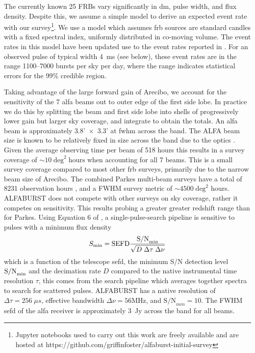 \documentclass[a4paper,fleqn,usenatbib]{mnras}
\begin{document}
The currently known 25 FRBs vary significantly in \gls{dm}, pulse width, and
flux density. Despite this, we assume a simple model to derive an expected
event rate with our survey\footnote{Jupyter notebooks used to carry out this
work are freely available and are hosted at
https://github.com/griffinfoster/alfaburst-initial-survey}.  We use a model
\citep[see equation 9 of][]{2013MNRAS.436L...5L} which assumes \gls{frb}
sources are standard candles with a fixed spectral index, uniformly distributed
in co-moving volume. The event rates in this model have been updated use to the
event rates reported in \cite{2016MNRAS.460.3370C}. For an observed pulse of
typical width 4~ms (see below), these event rates are in the range 1100--7000
bursts per sky per day, where the range indicates statistical errors for the
99\% credible region.

Taking advantage of the large forward gain of Arecibo, we account for
the sensitivity of the 7 \gls{alfa} beams out to outer edge of the first
side lobe. In practice we do this by splitting the beam and first
side lobe into shells of progressively lower gain but larger sky
coverage, and integrate to obtain the totals.
An \gls{alfa} beam is approximately 3.8'~$\times$~3.3' at \gls{fwhm} across the
band.  The ALFA beam size is known to be relatively fixed in size across the
band due to the optics \citep{GALFAbeam}.  Given the average observing time per
beam of 518 hours this results in a survey coverage of $\sim 10 \;
\textrm{deg}^2 \; \textrm{hours}$ when accounting for all 7 beams. This is a
small survey coverage compared to most other \gls{frb} surveys, primarily due to
the narrow beam size of Arecibo. The combined Parkes multi-beam surveys have a
total of 8231 observation hours \citep{2016MNRAS.460.3370C}, and a FWHM survey
metric of $\sim 4500 \; \textrm{deg}^2$ hours.  ALFABURST does not compete with
other surveys on sky coverage, rather it competes on sensitivity. This results 
probing a greater greater redshift range than for Parkes. Using
Equation 6 of \cite{2015MNRAS.452.1254K}, a  single-pulse-search pipeline is
sensitive to pulses with a minimum flux density
%
\begin{equation}
S_{\rm min} = \textrm{SEFD} \frac{\textrm{S/N}_{\rm min}}{\sqrt{D \; \Delta \tau \;
\Delta \nu}}
\end{equation}
%
which is a function of the telescope \gls{sefd}, the minimum S/N
detection level $\textrm{S/N}_{\rm min}$ and the decimation rate $D$
compared to the native instrumental time resolution $\tau$, this comes
from the search pipeline which averages together spectra to search for
scattered pulses. ALFABURST has a native resolution of $\Delta \tau =
256 \; \mu s$, effective bandwidth $\Delta \nu = 56 \textrm{MHz}$, and
$\textrm{S/N}_{min} = 10$. The FWHM \gls{sefd} of the \gls{alfa}
receiver is approximately 3~Jy across the band for all beams.
\end{document}
